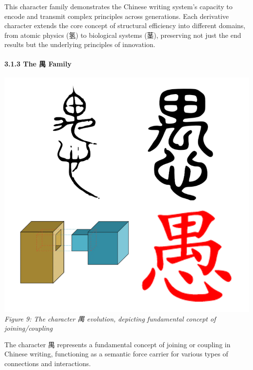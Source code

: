 This character family demonstrates the Chinese writing system's capacity
to encode and transmit complex principles across generations. Each
derivative character extends the core concept of structural efficiency
into different domains, from atomic physics (氢) to biological systems
(茎), preserving not just the end results but the underlying principles
of innovation.

\hypertarget{the-ux79ba-family}{%
\paragraph{3.1.3 The 禺 Family}\label{the-ux79ba-family}}

\includegraphics{./images/zi_join.png} \emph{Figure 9: The character 禺
evolution, depicting fundamental concept of joining/coupling}

The character 禺 represents a fundamental concept of joining or coupling
in Chinese writing, functioning as a semantic force carrier for various
types of connections and interactions.

